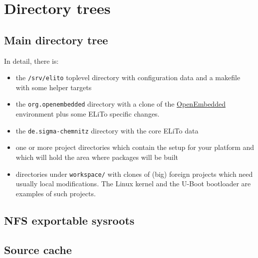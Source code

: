 \chapter{\label{app:dirtree}Directory trees}

\section{Main directory tree}
\label{sec:dirtree-main}

\vspace{1em}

In detail, there is:
\begin{itemize}
\item the \texttt{/srv/elito} toplevel directory with configuration
  data and a makefile with some helper targets
\item the \texttt{org.openembedded} directory with a clone of the
  \href{http://www.openembedded.org}{OpenEmbedded} environment plus
  some ELiTo specific changes.
\item the \texttt{de.sigma-chemnitz} directory with the core ELiTo
  data
\item one or more project directories which contain the setup for your
  platform and which will hold the area where packages will be built
\item directories under \texttt{workspace/} with clones of (big)
  foreign projects which need usually local modifications. The Linux
  kernel and the U-Boot bootloader are examples of such projects.
\end{itemize}

\section{NFS exportable sysroots}


\section{Source cache}


